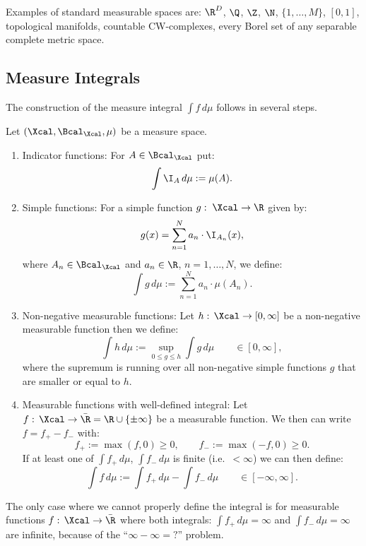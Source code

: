 \begin{Eg}
    Examples of standard measurable spaces are: $\R^D$, $\Q$, $\Z$, $\N$, $\{1,\dots,M\}$,  $[0,1]$, topological manifolds, countable CW-complexes, 
    every Borel set of any separable complete metric space.
\end{Eg}



\subsection{Measure Integrals}
\label{sec:measure-integral}


The construction of the measure integral $\int f\,d\mu$ follows in several steps.

\begin{Construction}
    Let $(\Xcal,\Bcal_\Xcal,\mu)$ be a measure space.
    \begin{enumerate}
        \item Indicator functions: For $A \in \Bcal_\Xcal$ put:
            \[\int \I_A\,d\mu := \mu(A).\]
        \item Simple functions: For a simple function $g:\; \Xcal \to \R$ given by: 
            \[ g(x)= \sum_{n=1}^N a_n \cdot \I_{A_n}(x), \]
            where  $A_n \in \Bcal_\Xcal$ %
            and $a_n \in \R$, $n=1,\dots,N$, we define: 
            \[ \int g\,d\mu := \sum_{n=1}^N a_n \cdot \mu(A_n). \]
        \item Non-negative measurable functions: Let $h:\, \Xcal \to [0,\infty]$ be a non-negative measurable function then we define:
            \[ \int h\, d\mu := \sup_{0 \le g \le h} \int g \, d\mu \qquad \in [0,\infty], \]
            where the supremum is running over all non-negative simple functions $g$ that are smaller or equal to $h$.
        \item Measurable functions with well-defined integral: Let $f:\, \Xcal \to \bar\R=\R \cup \{\pm \infty\}$ be a measurable function. 
            We then can  write  $f=f_+-f_-$ with:
            \[ f_+ := \max(f,0) \ge 0, \qquad f_-:= \max(-f,0) \ge 0.\]
            If at least one of $\int f_+\,d\mu$,  $\int f_-\,d\mu$ is finite (i.e.\ $< \infty$)
            we can then define:
            \[ \int f\, d\mu := \int f_+\,d\mu - \int f_-\,d\mu \qquad \in [-\infty,\infty].\]
        \end{enumerate}
   The only case where we cannot properly define the integral is for measurable functions $f:\, \Xcal \to \bar \R$ where both integrals: 
   $\int f_+ \,d\mu = \infty$ and $\int f_-\,d\mu = \infty$ are infinite, because of the ``$\infty - \infty = ?$'' problem.

\end{Construction}

